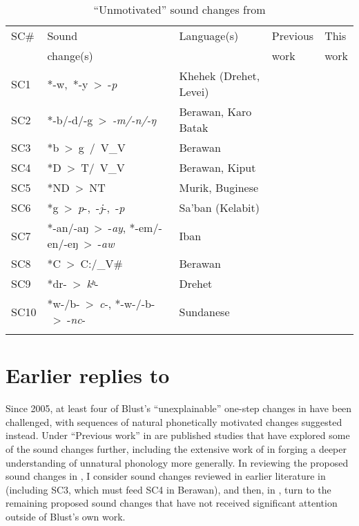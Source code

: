 \documentclass[output=paper]{langscibook}
\begin{document}
\begin{table}[t]
\small
\begin{tabularx}{\textwidth}{lQQll}
\lsptoprule
{SC\#} & {Sound} & Language(s) & Previous  & This \\
       & change(s) &           & work         & work\\
\midrule
SC1 & \mbox{*-w, *-y > -\textit{p}} & Khehek (Drehet, Levei) & \citet{Goddard2007} & \\
SC2 & \mbox{*-b/-d/-g > \textit{-m/-n/-ŋ}} & Berawan, Karo Batak & \citet{Blevins2007} & \\
SC3 & \mbox{*b > g / V\_V} & Berawan &  & \\
SC4 & \mbox{*D > T/ V\_V} & Berawan, Kiput & \citet{Beguš2018, Beguš2019} & \\
SC5 & \mbox{*ND > NT} & Murik, Buginese & \citet{Beguš2018, Beguš2019} & \\
SC6 & \mbox{*g > \textit{p}-, -\textit{j}-, -\textit{p}} & Sa’ban (Kelabit) &  & \\
SC7 & \mbox{*-an/-aŋ > -\textit{ay}}, \mbox{*-em/-en/-eŋ > -\textit{aw}} & Iban &  & \\
SC8 & \mbox{*C > C:/\_V\#} & Berawan &  & \\
SC9 & \mbox{*dr- > \textit{kʰ}-} & Drehet &  & \\
SC10 & \mbox{*w-/b- > \textit{c}-,} \mbox{*-w-/-b- > -\textit{nc}-} & Sundanese &  & \\
\lspbottomrule
\end{tabularx}
\caption{\label{tab:blevins:1}“Unmotivated” sound changes from \citet{Blust2005}}
\end{table}

\section{Earlier replies to \citet{Blust2005}}\label{sec:blevins:2}
Since 2005, at least four of Blust’s “unexplainable” one-step changes in  have been challenged, with sequences of natural phonetically motivated changes suggested instead. Under “Previous work” in  are published studies that have explored some of the sound changes further, including the extensive work of \citet{Beguš2018,Beguš2019,Beguš2020} in forging a deeper understanding of unnatural phonology more generally. In reviewing the proposed sound changes in , I consider sound changes reviewed in earlier literature in  (including SC3, which must feed SC4 in Berawan), and then, in , turn to the remaining proposed sound changes that have not received significant attention outside of Blust’s own work.
\end{document}
